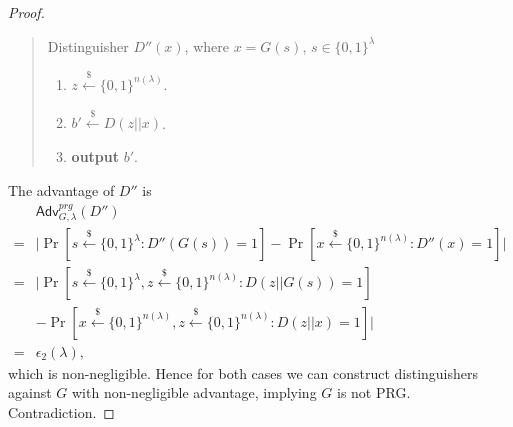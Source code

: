 \documentclass[12pt]{article}
\newcommand{\bits}{\{0,1\}}
\newcommand{\getsr}{\stackrel{\$}{\gets}}
\newcommand{\Adv}{\textsf{Adv}}
\theoremstyle{definition}
\begin{document}
\begin{proof}
\begin{quote}
Distinguisher $D'' (x)$, where $x=G(s)$, $s\in\bits^\lambda$
\begin{enumerate}
\item $z\getsr\bits^{n(\lambda)}$.
\item $b' \getsr D(z||x)$.
\item {\bf output} $b'$.
\end{enumerate}
\end{quote}
The advantage of $D''$ is
$$
\begin{aligned}
& \Adv_{G,\lambda}^{prg}(D'') \\
=& \bigg| \Pr[s\getsr\bits^\lambda : D''(G(s))=1] - \Pr[x\getsr\bits^{n(\lambda)}: D''(x)=1] \bigg| \\
=& \bigg| \Pr[s\getsr\bits^\lambda, z\getsr\bits^{n(\lambda)} : D(z||G(s))=1]\\
& - \Pr[x\getsr\bits^{n(\lambda)}, z\getsr\bits^{n(\lambda)}: D(z||x)=1] \bigg| \\
=& \epsilon_2(\lambda),
\end{aligned}
$$
which is non-negligible.
Hence for both cases we can construct distinguishers against $G$ with non-negligible advantage, implying $G$ is not PRG. Contradiction.
\end{proof}
\end{document}
